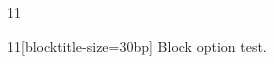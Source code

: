 \documentclass[paper=A4]{ropas-poster}
\begin{document}
\begin{postergrid}{1}{1}
\begin{posterblock}{1}{1}[blocktitle-size=30bp]
Block option test.
\end{posterblock}
\end{postergrid}
\end{document}
